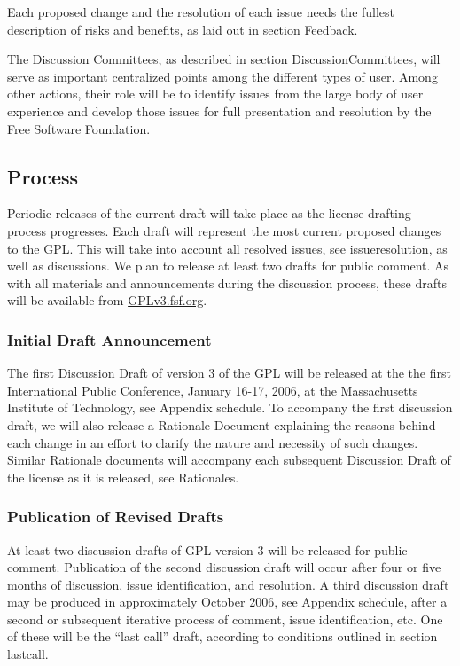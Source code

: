 \documentclass[a4paper,spanish,12pt]{book}
\begin{document}
Each proposed change and the resolution of each issue needs the
fullest description of risks and benefits, as laid out in section
Feedback.

The Discussion Committees, as described in section
DiscussionCommittees, will serve as important centralized points
among the different types of user.  Among other actions, their role
will be to identify issues from the large body of user experience and
develop those issues for full presentation and resolution by the Free
Software Foundation.


\subsection{Process} Periodic releases of the current draft will take
place as the license-drafting process progresses.  Each draft will
represent the most current proposed changes to the GPL.  This will
take into account all resolved issues, see issueresolution, as
well as discussions.  We plan to release at least two drafts for
public comment.  As with all materials and announcements during the
discussion process, these drafts will be available from
\url{GPLv3.fsf.org}.

\subsubsection{Initial Draft Announcement} The first Discussion Draft of
version 3 of the GPL will be released at the the first International
Public Conference, January 16-17, 2006, at the Massachusetts Institute
of Technology, see Appendix schedule. To accompany the first
discussion draft, we will also release a Rationale Document explaining
the reasons behind each change in an effort to clarify the nature and
necessity of such changes.  Similar Rationale documents will accompany
each subsequent Discussion Draft of the license as it is released, see
Rationales.

\subsubsection{Publication of Revised Drafts} At least two discussion drafts
of GPL version 3 will be released for public comment.  Publication of
the second discussion draft will occur after four or five months of
discussion, issue identification, and resolution.  A third discussion
draft may be produced in approximately October 2006, see Appendix
schedule, after a second or subsequent iterative process of
comment, issue identification, etc.  One of these will be the ``last
call'' draft, according to conditions outlined in section
lastcall.
\end{document}
